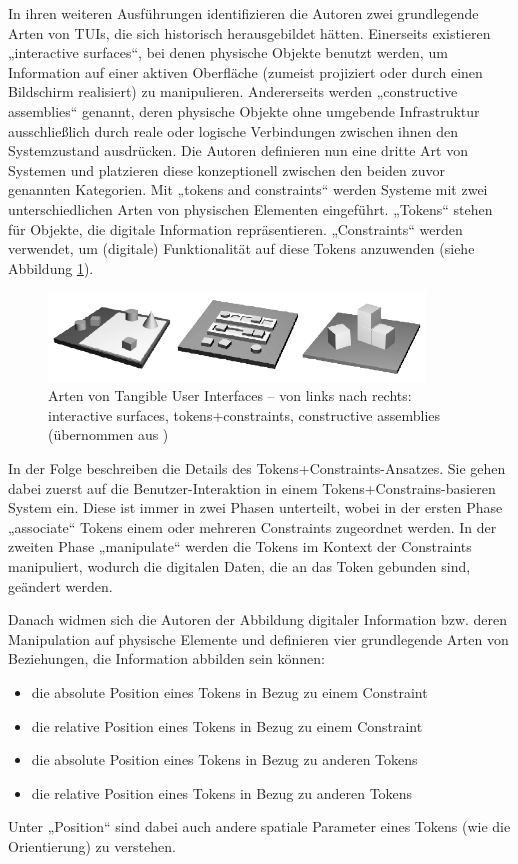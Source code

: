 In ihren weiteren Ausführungen identifizieren die Autoren zwei grundlegende Arten von \glspl{TUI}, die sich historisch herausgebildet hätten. Einerseits existieren „interactive surfaces“, bei denen physische Objekte benutzt werden, um Information auf einer aktiven Oberfläche (zumeist projiziert oder durch einen Bildschirm realisiert) zu manipulieren. Andererseits werden „constructive assemblies“ genannt, deren physische Objekte ohne umgebende Infrastruktur ausschließlich durch reale oder logische Verbindungen zwischen ihnen den Systemzustand ausdrücken. Die Autoren definieren nun eine dritte Art von Systemen und platzieren diese konzeptionell zwischen den beiden zuvor genannten Kategorien. Mit „tokens and constraints“ werden Systeme mit zwei unterschiedlichen Arten von physischen Elementen eingeführt. „Tokens“ stehen für Objekte, die digitale Information repräsentieren. „Constraints“ werden verwendet, um (digitale) Funktionalität auf diese Tokens anzuwenden (siehe Abbildung \ref{fig:img_ImplementierungUeberblick_is_tac_ca}).

\begin{figure}[htbp]
	\centering
		\includegraphics[width=10cm]{img/ImplementierungUeberblick/is_tac_ca.png}
	\caption[Arten von Tangible User Interfaces]{Arten von Tangible User Interfaces -- von links nach rechts: interactive surfaces, tokens+constraints, constructive assemblies (übernommen aus \citet{Ullmer05})}
	\label{fig:img_ImplementierungUeberblick_is_tac_ca}
\end{figure}

In der Folge beschreiben \citeauthor{Ullmer05} die Details des Tokens+Constraints-Ansatzes. Sie gehen dabei zuerst auf die Benutzer-Interaktion in einem Tokens+Constrains-basieren System ein. Diese ist immer in zwei Phasen unterteilt, wobei in der ersten Phase „associate“ Tokens einem oder mehreren Constraints zugeordnet werden. In der zweiten Phase „manipulate“ werden die Tokens im Kontext der Constraints manipuliert, wodurch die digitalen Daten, die an das Token gebunden sind, geändert werden.

Danach widmen sich die Autoren der Abbildung digitaler Information bzw. deren Manipulation auf physische Elemente und definieren vier grundlegende Arten von Beziehungen, die Information abbilden sein können:
\begin{itemize}
	\item die absolute Position eines Tokens in Bezug zu einem Constraint
	\item die relative Position eines Tokens in Bezug zu einem Constraint
	\item die absolute Position eines Tokens in Bezug zu anderen Tokens
	\item die relative Position eines Tokens in Bezug zu anderen Tokens
\end{itemize}
Unter „Position“ sind dabei auch andere spatiale Parameter eines Tokens (wie die Orientierung) zu verstehen.

